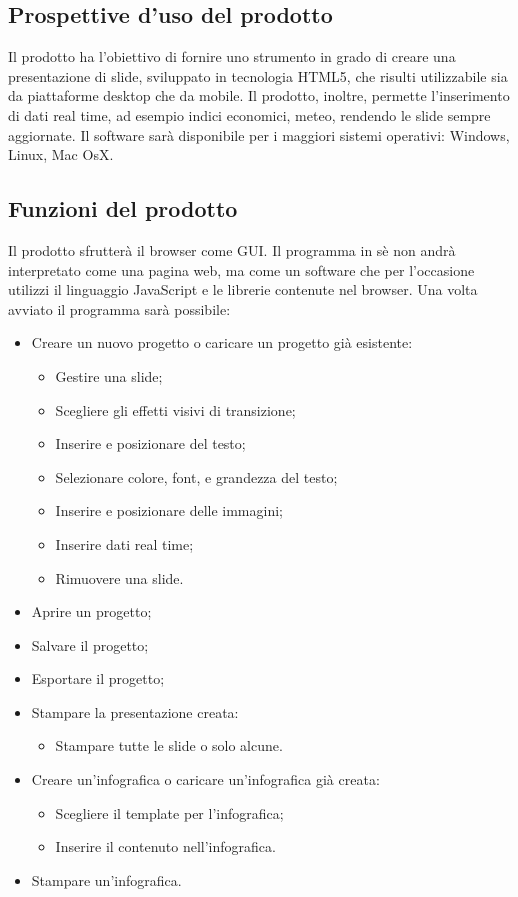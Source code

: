 \subsection{Prospettive d'uso del prodotto}
Il prodotto ha l'obiettivo di fornire uno strumento in grado di creare una presentazione di \gls{slide}, sviluppato in tecnologia \gls{HTML5}, che risulti utilizzabile sia da piattaforme desktop che da mobile. Il prodotto, inoltre, permette l'inserimento di dati \gls{real time}, ad esempio indici economici, meteo, rendendo le \gls{slide} sempre aggiornate. Il software sarà disponibile per i maggiori sistemi operativi: \gls{Windows}, \gls{Linux}, \gls{Mac OsX}.

\subsection{Funzioni del prodotto}
Il prodotto sfrutterà il \gls{browser} come \gls{GUI}. Il programma in sè non andrà interpretato come una pagina web, ma come un software che per l'occasione utilizzi il linguaggio \gls{JavaScript} e le librerie contenute nel \gls{browser}.
Una volta avviato il programma sarà possibile:
\begin{itemize}
	\item Creare un nuovo progetto o caricare un progetto già esistente:
	\begin{itemize}
		\item Gestire una \gls{slide};
		\item Scegliere gli effetti visivi di transizione;
		\item Inserire e posizionare del testo;
		\item Selezionare colore, \gls{font}, e grandezza del testo;
		\item Inserire e posizionare delle immagini;
		\item Inserire dati \gls{real time};
		\item Rimuovere una \gls{slide}.
	\end{itemize}
	\item Aprire un progetto;
	\item Salvare il progetto;
	\item Esportare il progetto;
	\item Stampare la presentazione creata:
	\begin{itemize}
		\item Stampare tutte le \gls{slide} o solo alcune.
	\end{itemize}
	\item Creare un'\gls{infografica} o caricare un'\gls{infografica} già creata:
	\begin{itemize}
		\item Scegliere il \gls{template} per l'\gls{infografica};
		\item Inserire il contenuto nell'\gls{infografica}.
	\end{itemize}
	\item Stampare un'\gls{infografica}.
\end{itemize}

